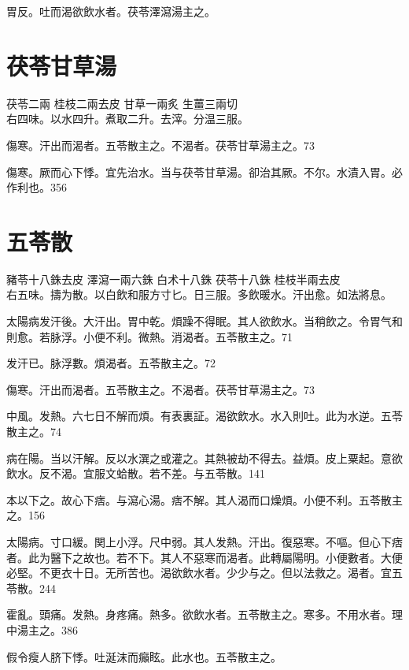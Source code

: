 胃反。吐而渴欲飲水者。茯苓澤瀉湯主之。


\section{茯苓甘草湯}

茯苓{\scriptsize 二兩} 桂枝{\scriptsize 二兩去皮} 甘草{\scriptsize 一兩炙} 生薑{\scriptsize 三兩切}\\
右四味。以水四升。煮取二升。去滓。分温三服。

傷寒。汗出而渴者。五苓散主之。不渴者。茯苓甘草湯主之。73

傷寒。厥而心下悸。宜先治水。当与茯苓甘草湯。卻治其厥。不尔。水漬入胃。必作利也。356

\section{五苓散}

豬苓{\scriptsize 十八銖去皮} 澤瀉{\scriptsize 一兩六銖} 白术{\scriptsize 十八銖} 茯苓{\scriptsize 十八銖} 桂枝{\scriptsize 半兩去皮}\\
右五味。擣为散。以白飲和服方寸匕。日三服。多飲暖水。汗出愈。如法將息。

太陽病发汗後。大汗出。胃中乾。煩躁不得眠。其人欲飲水。当稍飲之。令胃气和則愈。若脉浮。小便不利。微熱。消渴者。五苓散主之。71

发汗已。脉浮數。煩渴者。五苓散主之。72

傷寒。汗出而渴者。五苓散主之。不渴者。茯苓甘草湯主之。73

中風。发熱。六七日不解而煩。有表裏証。渴欲飲水。水入則吐。此为水逆。五苓散主之。74

病在陽。当以汗解。反以水潠之或灌之。其熱被劫不得去。益煩。皮上粟起。意欲飲水。反不渴。宜服文蛤散。若不差。与五苓散。141

本以下之。故心下痞。与瀉心湯。痞不解。其人渴而口燥{\khaaitp 煩}。小便不利。五苓散主之。156

太陽病。寸{\khaaitp 口}緩。関{\khaaitp 上小}浮。尺{\khaaitp 中}弱。其人发熱。汗出。復惡寒。不嘔。但心下痞者。此为醫下之故也。若不下。其人不惡寒而渴者。此轉屬陽明。小便數者。大便必堅。不更衣十日。无所苦也。{\khaaitp 渴}欲飲水者。少少与之。但以法救之。渴者。宜五苓散。244

霍亂。頭痛。发熱。身疼痛。熱多。欲飲水者。五苓散主之。寒多。不用水者。理中湯主之。386

假令瘦人脐下悸。吐涎沫而癲眩。{\khaaitp 此}水也。五苓散主之。

